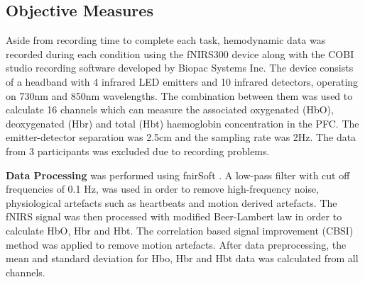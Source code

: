 \documentclass[../main/Feedback.tex]{subfiles}
\begin{document}
\subsection{Objective Measures}
Aside from recording time to complete each task, hemodynamic data was recorded during each condition using the fNIRS300 device along with the COBI studio recording software developed by Biopac Systems Inc.
The device consists of a headband with 4 infrared LED emitters and 10 infrared detectors, operating on 730nm and 850nm wavelengths.
The combination between them was used to calculate 16 channels which can measure the associated oxygenated (HbO), deoxygenated (Hbr) and total (Hbt) haemoglobin concentration in the PFC.
The emitter-detector separation was 2.5cm and the sampling rate was 2Hz.
The data from 3 participants was excluded due to recording problems.

\textbf{Data Processing} was performed using fnirSoft \cite{ayazfunctional}.
A low-pass filter with cut off frequencies of 0.1 Hz, was used in order to remove high-frequency noise, physiological artefacts such as heartbeats and motion derived artefacts.
The fNIRS signal was then processed with modified Beer-Lambert law \cite{cope1988system} in order to calculate HbO, Hbr and Hbt.
The correlation based signal improvement (CBSI) \cite{cui2010functional} method was applied to remove motion artefacts.
After data preprocessing, the mean and standard deviation for Hbo, Hbr and Hbt data was calculated from all channels.
\end{document}
